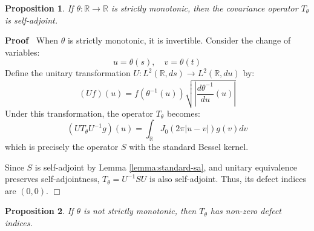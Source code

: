 \documentclass{article}
\newenvironment{proof}{\noindent\textbf{Proof\ }}{\hspace*{\fill}$\Box$\medskip}
\newtheorem{proposition}{Proposition}
\begin{document}
\begin{proposition}
  \label{prop:monotonic-implies-sa}If $\theta : \mathbb{R} \to \mathbb{R}$ is
  strictly monotonic, then the covariance operator $T_{\theta}$ is
  self-adjoint.
\end{proposition}

\begin{proof}
  When $\theta$ is strictly monotonic, it is invertible. Consider the change
  of variables:
  \begin{equation}
    u = \theta (s), \quad v = \theta (t)
  \end{equation}
  Define the unitary transformation $U : L^2 (\mathbb{R}, ds) \to L^2
  (\mathbb{R}, du)$ by:
  \begin{equation}
    (Uf) (u) = f (\theta^{- 1} (u)) \sqrt{\left| \frac{d \theta^{- 1}}{du} (u)
    \right|}
  \end{equation}
  Under this transformation, the operator $T_{\theta}$ becomes:
  \begin{equation}
    (UT_{\theta} U^{- 1} g) (u) = \int_{\mathbb{R}} J_0  (2 \pi |u - v|) g (v)
    dv
  \end{equation}
  which is precisely the operator $S$ with the standard Bessel kernel.
  
  Since $S$ is self-adjoint by Lemma \ref{lemma:standard-sa}, and unitary
  equivalence preserves self-adjointness, $T_{\theta} = U^{- 1} SU$ is also
  self-adjoint. Thus, its defect indices are $(0, 0)$.
\end{proof}

\begin{proposition}
  \label{prop:nonmonotonic-implies-defect}If $\theta$ is not strictly
  monotonic, then $T_{\theta}$ has non-zero defect indices.
\end{proposition}
\end{document}
